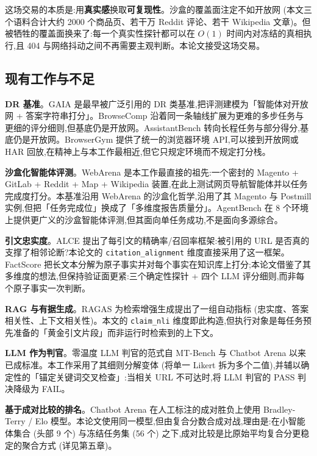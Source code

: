 \documentclass[UTF8,a4paper,12pt,oneside]{ctexart}
\begin{document}
这场交易的本质是:用\textbf{真实感}换取\textbf{可复现性}。沙盒的覆盖面注定不如开放网 (本文三个语料合计大约 2000 个商品页、若干万 Reddit 评论、若干 Wikipedia 文章)。但被牺牲的覆盖面换来了:每一个真实性探针都可以在 \(O(1)\) 时间内对冻结的真相执行,且 404 与网络抖动之间不再需要主观判断。本论文接受这场交易。

\subsection{现有工作与不足}

\textbf{DR 基准}。GAIA \cite{gaia} 是最早被广泛引用的 DR 类基准,把评测建模为「智能体对开放网 + 答案字符串打分」。BrowseComp \cite{browsecomp} 沿着同一条轴线扩展为更难的多步任务与更细的评分细则,但基底仍是开放网。AssistantBench \cite{assistantbench} 转向长程任务与部分得分,基底仍是开放网。BrowserGym \cite{browsergym} 提供了统一的浏览器环境 API,可以接到开放网或 HAR 回放,在精神上与本工作最相近,但它只规定环境而不规定打分栈。

\textbf{沙盒化智能体评测}。WebArena \cite{webarena} 是本工作最直接的祖先:一个密封的 Magento + GitLab + Reddit + Map + Wikipedia 装置,在此上测试网页导航智能体并以任务完成度打分。本基准沿用 WebArena 的沙盒化哲学,沿用了其 Magento 与 Postmill 实例,但把「任务完成位」换成了「多维度报告质量分」。AgentBench \cite{agentbench} 在 8 个环境上提供更广义的沙盒智能体评测,但其面向单任务成功,不是面向多源综合。

\textbf{引文忠实度}。ALCE \cite{alce} 提出了每引文的精确率/召回率框架:被引用的 URL 是否真的支撑了相邻论断?本论文的 \texttt{citation\_alignment} 维度直接采用了这一框架。FactScore \cite{factscore} 把长文本分解为原子事实并对每个事实在知识库上打分;本论文借鉴了其多维度的想法,但保持验证面更紧:三个确定性探针 + 四个 LLM 评分细则,而非每个原子事实一次判断。

\textbf{RAG 与有据生成}。RAGAS \cite{ragas} 为检索增强生成提出了一组自动指标 (忠实度、答案相关性、上下文相关性)。本文的 \texttt{claim\_nli} 维度即此构造,但执行对象是每任务预先准备的「黄金引文片段」而非运行时检索到的上下文。

\textbf{LLM 作为判官}。零温度 LLM 判官的范式自 MT-Bench \cite{mtbench} 与 Chatbot Arena \cite{arena} 以来已成标准。本工作采用了其细则分解变体 (将单一 Likert 拆为多个二值),并辅以确定性的「锚定关键词交叉检查」:当相关 URL 不可达时,将 LLM 判官的 PASS 判决降级为 FAIL。

\textbf{基于成对比较的排名}。Chatbot Arena \cite{arena} 在人工标注的成对胜负上使用 Bradley-Terry \cite{bt} / Elo \cite{elo} 模型。本论文使用同一模型,但由复合分数合成对战,理由是:在小智能体集合 (头部 9 个) 与冻结任务集 (56 个) 之下,成对比较是比原始平均复合分更稳定的聚合方式 (详见第五章)。
\end{document}
